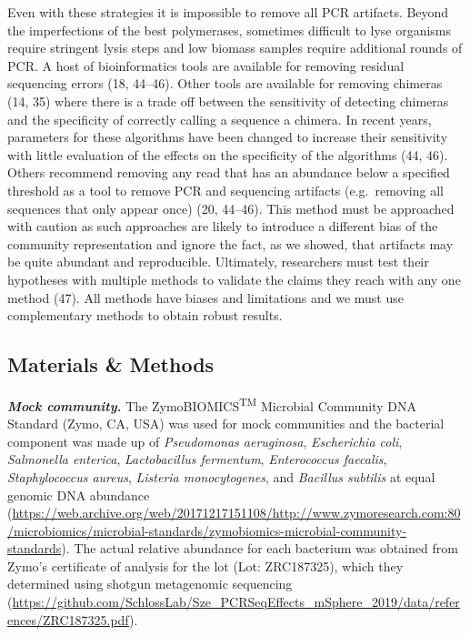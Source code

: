 \documentclass[11pt,]{article}
\begin{document}
Even with these strategies it is impossible to remove all PCR artifacts.
Beyond the imperfections of the best polymerases, sometimes difficult to
lyse organisms require stringent lysis steps and low biomass samples
require additional rounds of PCR. A host of bioinformatics tools are
available for removing residual sequencing errors (18, 44--46). Other
tools are available for removing chimeras (14, 35) where there is a
trade off between the sensitivity of detecting chimeras and the
specificity of correctly calling a sequence a chimera. In recent years,
parameters for these algorithms have been changed to increase their
sensitivity with little evaluation of the effects on the specificity of
the algorithms (44, 46). Others recommend removing any read that has an
abundance below a specified threshold as a tool to remove PCR and
sequencing artifacts (e.g.~removing all sequences that only appear once)
(20, 44--46). This method must be approached with caution as such
approaches are likely to introduce a different bias of the community
representation and ignore the fact, as we showed, that artifacts may be
quite abundant and reproducible. Ultimately, researchers must test their
hypotheses with multiple methods to validate the claims they reach with
any one method (47). All methods have biases and limitations and we must
use complementary methods to obtain robust results.

\newpage

\hypertarget{materials-methods}{%
\subsection{Materials \& Methods}\label{materials-methods}}

\textbf{\emph{Mock community.}} The ZymoBIOMICS\textsuperscript{TM}
Microbial Community DNA Standard (Zymo, CA, USA) was used for mock
communities and the bacterial component was made up of \emph{Pseudomonas
aeruginosa}, \emph{Escherichia coli}, \emph{Salmonella enterica},
\emph{Lactobacillus fermentum}, \emph{Enterococcus faecalis},
\emph{Staphylococcus aureus}, \emph{Listeria monocytogenes}, and
\emph{Bacillus subtilis} at equal genomic DNA abundance
(\url{https://web.archive.org/web/20171217151108/http://www.zymoresearch.com:80/microbiomics/microbial-standards/zymobiomics-microbial-community-standards}).
The actual relative abundance for each bacterium was obtained from
Zymo's certificate of analysis for the lot (Lot: ZRC187325), which they
determined using shotgun metagenomic sequencing
(\url{https://github.com/SchlossLab/Sze_PCRSeqEffects_mSphere_2019/data/references/ZRC187325.pdf}).
\end{document}

